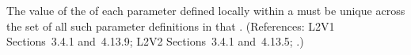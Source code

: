 The value of the   of each parameter defined locally within
a \KineticLaw must be unique across the set of all such parameter
definitions in that \KineticLaw.  (References: L2V1 Sections~3.4.1 and~4.13.9;
L2V2 Sections~3.4.1 and~4.13.5;
.)

